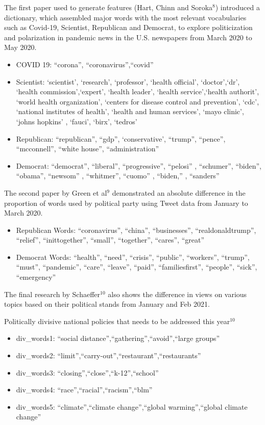 \documentclass[
]{article}
\begin{document}
The first paper used to generate features (Hart, Chinn and
Soroka\(^{8}\)) introduced a dictionary, which assembled major words
with the most relevant vocabularies such as Covid-19, Scientist,
Republican and Democrat, to explore politicization and polarization in
pandemic news in the U.S. newspapers from March 2020 to May 2020.

\begin{itemize}
\item
  COVID 19: ``corona'', ``coronavirus'',``covid''
\item
  Scientist: `scientist', `research', `professor', `health official',
  `doctor',`dr', `health commission',`expert', `health leader', `health
  service',`health authorit', `world health organization', `centers for
  disease control and prevention', `cdc', `national institutes of
  health', `health and human services', `mayo clinic', `johns hopkins' ,
  `fauci', `birx', `tedros'
\item
  Republican: ``republican'', ``gdp'', `conservative', ``trump'',
  ``pence'', ``mcconnell'', ``white house'', ``administration''
\item
  Democrat: ``democrat'', ``liberal'', ``progressive'', ``pelosi'' ,
  ``schumer'', ``biden'', ``obama'', ``newsom'' , ``whitmer'', ``cuomo''
  , ``biden,'' , ``sanders''
\end{itemize}

The second paper by Green et al\(^{9}\) demonstrated an absolute
difference in the proportion of words used by political party using
Tweet data from January to March 2020.

\begin{itemize}
\item
  Republican Words: ``coronavirus'', ``china'', ``businesses'',
  ``realdonaldtrump'', ``relief'', ``inittogether'', ``small'',
  ``together'', ``cares'', ``great''
\item
  Democrat Words: ``health'', ``need'', ``crisis'', ``public'',
  ``workers'', ``trump'', ``must'', ``pandemic'', ``care'', ``leave'',
  ``paid'', ``familiesfirst'', ``people'', ``sick'', ``emergency''
\end{itemize}

The final research by Schaeffer\(^{10}\) also shows the difference in
views on various topics based on their political stands from January and
Feb 2021.

Politically divisive national policies that needs to be addressed this
year\(^{10}\)

\begin{itemize}
\item
  div\_words1: ``social distance'',``gathering'',``avoid'',``large
  groups''
\item
  div\_words2: ``limit'',``carry-out'',``restaurant'',``restaurants''
\item
  div\_words3: ``closing'',``close'',``k-12'',``school''
\item
  div\_words4: ``race'',``racial'',``racism'',``blm''
\item
  div\_words5: ``climate'',``climate change'',``global
  warming'',``global climate change''
\end{itemize}
\end{document}
